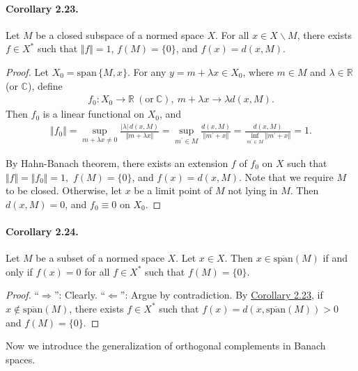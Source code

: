 \documentclass{article}
\begin{document}
\paragraph{Corollary 2.23.\label{cor:2.23}} Let $M$ be a closed subspace of a normed space $X$. For all $x\in X\backslash M$, there exists $f\in X^*$ such that $\Vert f\Vert=1$, $f(M)=\{0\}$, and $f(x)=d(x,M)$.
\begin{proof}
Let $X_0=\mathrm{span}\,\{M,x\}$. For any $y=m+\lambda x\in X_0$, where $m\in M$ and $\lambda\in\mathbb{R}$ (or $\mathbb{C}$), define
\begin{align*}
	f_0:X_0\to\mathbb{R}\ (\text{or}\ \mathbb{C}),\ m+\lambda x\to \lambda d(x,M).
\end{align*}
Then $f_0$ is a linear functional on $X_0$, and
\begin{align*}
	\Vert f_0\Vert = \sup_{m+\lambda x\neq 0}\frac{\vert\lambda\vert\, d(x,M)}{\Vert m+\lambda x\Vert} = \sup_{m^\prime\in M}\frac{d(x,M)}{\Vert m^\prime + x\Vert} = \frac{d(x,M)}{\inf_{m^\prime\in M}\Vert m^\prime + x\Vert}  = 1.
\end{align*}

By Hahn-Banach theorem, there exists an extension $f$ of $f_0$ on $X$ such that $\Vert f\Vert = \Vert f_0\Vert = 1,$ $f(M)=\{0\}$, and $f(x) = d(x,M)$. Note that we require $M$ to be closed. Otherwise, let $x$ be a limit point of $M$ not lying in $M$. Then $d(x,M)=0$, and $f_0\equiv 0$ on $X_0$.
\end{proof}

\paragraph{Corollary 2.24.\label{cor:2.24}} Let $M$ be a subset of a normed space $X$. Let $x\in X$. Then $x\in\overline{\mathrm{span}}(M)$ if and only if $f(x)=0$ for all $f\in X^*$ such that $f(M)=\{0\}$.
\begin{proof}
``$\Rightarrow$'': Clearly. \quad ``$\Leftarrow$'': Argue by contradiction. By \hyperref[cor:2.23]{Corollary 2.23}, if $x\notin \overline{\mathrm{span}}(M)$, there exists $f\in X^*$ such that $f(x)=d(x,\overline{\mathrm{span}}(M))>0$ and $f(M)=\{0\}$.
\end{proof}

Now we introduce the generalization of orthogonal complements in Banach spaces.
\end{document}
